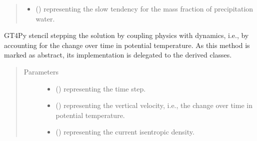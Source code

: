 \documentclass[letterpaper,10pt,english]{sphinxmanual}
\begin{document}
\begin{fulllineitems}
\begin{fulllineitems}
\begin{quote}
\begin{description}
\begin{itemize}
\item {} 
 () \textendash{}  representing the slow tendency for the mass fraction of precipitation water.

\end{itemize}


\end{description}\end{quote}

\end{fulllineitems}


\begin{fulllineitems}
\label{\detokenize{api:dycore.prognostic_isentropic_nonconservative_centered.PrognosticIsentropicNonconservativeCentered._stencil_stepping_by_coupling_physics_with_dynamics_defs}}
GT4Py stencil stepping the solution by coupling physics with dynamics, i.e., by accounting for the
change over time in potential temperature.
As this method is marked as abstract, its implementation is delegated to the derived classes.
\begin{quote}\begin{description}
\item[{Parameters}] \leavevmode\begin{itemize}
\item {} 
 () \textendash{}  representing the time step.

\item {} 
 () \textendash{}  representing the vertical velocity, i.e., the change over time in potential temperature.

\item {} 
 () \textendash{}  representing the current isentropic density.


\end{itemize}
\end{description}
\end{quote}
\end{fulllineitems}
\end{fulllineitems}
\end{document}
